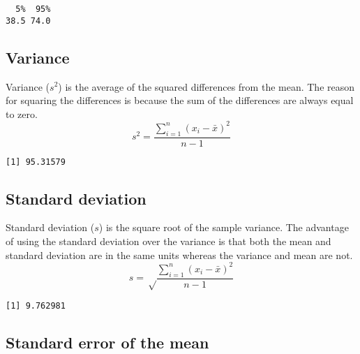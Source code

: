 \documentclass[]{book}
\newenvironment{Shaded}{\begin{snugshade}}{\end{snugshade}}
\newcommand{\KeywordTok}[1]{\textcolor[rgb]{0.13,0.29,0.53}{\textbf{#1}}}
\newcommand{\CommentTok}[1]{\textcolor[rgb]{0.56,0.35,0.01}{\textit{#1}}}
\newcommand{\OperatorTok}[1]{\textcolor[rgb]{0.81,0.36,0.00}{\textbf{#1}}}
\newcommand{\NormalTok}[1]{#1}
\theoremstyle{definition}
\theoremstyle{definition}
\theoremstyle{definition}
\theoremstyle{remark}
\begin{document}
\begin{verbatim}
  5%  95% 
38.5 74.0 
\end{verbatim}

\subsection{Variance}\label{variance}

Variance (\({s^2}\)) is the average of the squared differences from the
mean. The reason for squaring the differences is because the sum of the
differences are always equal to zero.
\[{s^2=\frac{\sum_{i=1}^n(x_i-\bar{x})^2}{n-1}}\]

\begin{Shaded}
\end{Shaded}

\begin{verbatim}
[1] 95.31579
\end{verbatim}

\subsection{Standard deviation}\label{standard-deviation}

Standard deviation (\({s}\)) is the square root of the sample variance.
The advantage of using the standard deviation over the variance is that
both the mean and standard deviation are in the same units whereas the
variance and mean are not.
\[{s=\sqrt\frac{\sum_{i=1}^n(x_i-\bar{x})^2}{n-1}}\]

\begin{Shaded}
\end{Shaded}

\begin{verbatim}
[1] 9.762981
\end{verbatim}

\subsection{Standard error of the
mean}\label{standard-error-of-the-mean}
\end{document}
